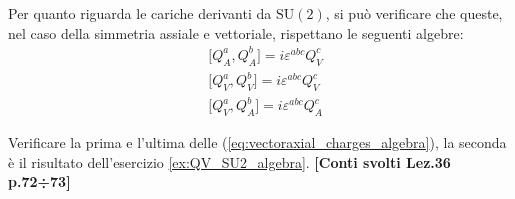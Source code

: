 \documentclass[../main.tex]{subfiles}
\begin{document}
Per quanto riguarda le cariche derivanti da $\textrm{SU}(2)$, si può verificare che queste, nel caso della simmetria assiale e vettoriale, rispettano le seguenti algebre:
\begin{equation}
    \begin{aligned}
        &\big[Q_A^a,Q_A^b\big] = i\varepsilon^{abc}Q_V^c \\
        &\big[Q_V^a,Q_V^b\big] = i\varepsilon^{abc}Q_V^c \\
        &\big[Q_V^a,Q_A^b\big] = i\varepsilon^{abc}Q_A^c
    \end{aligned}
    \label{eq:vectoraxial_charges_algebra}
\end{equation}
\begin{exercise}
    Verificare la prima e l'ultima delle (\ref{eq:vectoraxial_charges_algebra}), la seconda è il risultato dell'esercizio \ref{ex:QV_SU2_algebra}. \textbf{[Conti svolti Lez.36 p.72÷73]}
\end{exercise}
\end{document}
